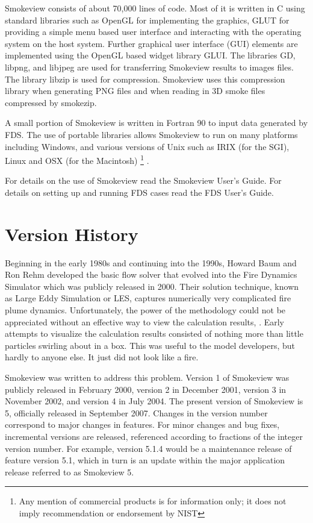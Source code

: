 \documentclass[11pt,twoside]{book}
\begin{document}
Smokeview consists of about 70,000 lines of code.  Most of it is
written in C using standard libraries such as
OpenGL\cite{OpenGLRed} for implementing the graphics, GLUT\cite{OpenGLGlut} for providing a
simple menu based user interface and interacting with the operating system on the host system.
Further graphical user interface (GUI) elements are implemented using the
OpenGL based widget library GLUI\cite{GLUILIB}.
The libraries GD\cite{GDLIB}, libpng\cite{PNGLIB},
and libjpeg\cite{JPEGLIB} are used for transferring Smokeview results to images files.  The library
libzip\cite{ZLIB} is used for compression.  Smokeview uses this compression library when generating PNG files and when reading in 3D smoke files compressed by smokezip.

A small portion of Smokeview is written in Fortran 90 to input data
generated by FDS.  The use of portable libraries allows Smokeview
to run on many platforms including Windows, and various versions
of Unix such as IRIX (for the SGI), Linux and OSX (for the
Macintosh)
\footnote{
Any mention of commercial products is for information only;  it does not imply recommendation or endorsement by NIST}
.

For details on the use of Smokeview read the Smokeview User's
Guide\cite{Smokeview_Users_Guide_5}. For details on setting up and
running FDS cases read the FDS User's
Guide\cite{FDS_Users_Guide_5}.

\section{Version History}

Beginning in the early 1980s and continuing into the 1990s, Howard Baum and Ron Rehm developed the basic flow solver that evolved into the Fire Dynamics Simulator which was publicly released in 2000.  Their solution technique, known as Large Eddy Simulation or LES, captures numerically very complicated fire plume dynamics.  Unfortunately, the power of the methodology could not be appreciated without an effective way to view the calculation results, .  Early attempts to visualize the calculation results consisted of nothing more than little particles swirling about in a box.  This was useful to the model developers, but hardly to anyone else.  It just did not look like a fire.

Smokeview was written to address this problem.
Version 1 of Smokeview was publicly released in February 2000, version 2 in December 2001, version 3 in November 2002, and version 4 in July 2004.
The present version of Smokeview is 5, officially released in September 2007. Changes in
the version number correspond to major changes in features. For minor changes and bug fixes, incremental
versions are released, referenced according to fractions of the integer
version number. For example, version 5.1.4 would be a maintenance release of feature
version 5.1, which in turn is an update within the major application release referred to as Smokeview 5.
\end{document}
